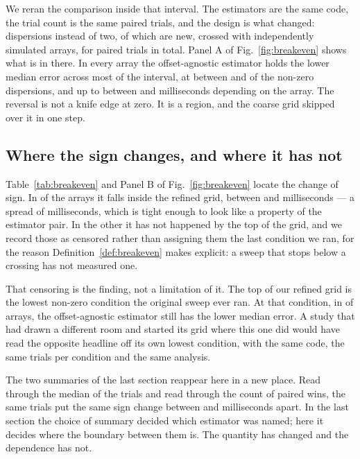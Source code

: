 We reran the comparison inside that interval. The estimators are the same code,
the trial count is the same \FineTrials{} paired trials, and the design is what
changed: \FineLevels{} dispersions instead of two, of which \FineAdded{} are new,
crossed with \FineRooms{} independently simulated arrays, for \FinePairs{} paired
trials in total. Panel A of Fig.~\ref{fig:breakeven} shows what is in
there. In every array the offset-agnostic estimator holds the lower median error
across most of the interval, at between \ReversalLevelsLow{} and
\ReversalLevelsHigh{} of the \FineNonzeroLevels{} non-zero dispersions, and up to
between \ReversalLow{} and \ReversalHigh{} milliseconds depending on the array.
The reversal is not a knife edge at zero. It is a region, and the coarse grid
skipped over it in one step.

\subsection{Where the sign changes, and where it has not}

Table~\ref{tab:breakeven} and Panel B of Fig.~\ref{fig:breakeven}
locate the change of sign. In \CrossedRooms{} of the \FineRooms{} arrays it falls
inside the refined grid, between \CrossingLow{} and \CrossingHigh{} milliseconds
--- a spread of \CrossingSpread{} milliseconds, which is tight enough to look
like a property of the estimator pair. In the other \CensoredRooms{} it has not
happened by the top of the grid, and we record those as censored rather than
assigning them the last condition we ran, for the reason
Definition~\ref{def:breakeven} makes explicit: a sweep that stops below a
crossing has not measured one.

That censoring is the finding, not a limitation of it. The top of our refined
grid is the lowest non-zero condition the original sweep ever ran. At that
condition, in \AnchorAgnosticRooms{} of \FineRooms{} arrays, the offset-agnostic
estimator still has the lower median error. A study that had drawn a different
room and started its grid where this one did would have read the opposite
headline off its own lowest condition, with the same code, the same trials per
condition and the same analysis.

The two summaries of the last section reappear here in a new place. Read through
the median of the trials and read through the count of paired wins, the same
trials put the same sign change between \RuleSepLow{} and \RuleSepHigh{}
milliseconds apart. In the last section the choice of summary decided which
estimator was named; here it decides where the boundary between them is. The
quantity has changed and the dependence has not.

